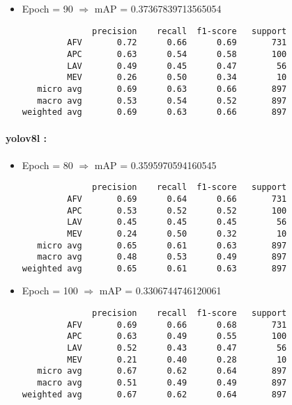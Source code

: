 \begin{itemize}
    \item Epoch = 90 $\Rightarrow$ mAP = 0.37367839713565054
          \begin{verbatim}
              precision    recall  f1-score   support
         AFV       0.72      0.66      0.69       731
         APC       0.63      0.54      0.58       100
         LAV       0.49      0.45      0.47        56
         MEV       0.26      0.50      0.34        10
   micro avg       0.69      0.63      0.66       897
   macro avg       0.53      0.54      0.52       897
weighted avg       0.69      0.63      0.66       897
    \end{verbatim}
\end{itemize}

\paragraph{yolov8l :}
\begin{itemize}
    \item Epoch = 80 $\Rightarrow$ mAP = 0.3595970594160545
          \begin{verbatim}
              precision    recall  f1-score   support
         AFV       0.69      0.64      0.66       731
         APC       0.53      0.52      0.52       100
         LAV       0.45      0.45      0.45        56
         MEV       0.24      0.50      0.32        10
   micro avg       0.65      0.61      0.63       897
   macro avg       0.48      0.53      0.49       897
weighted avg       0.65      0.61      0.63       897
    \end{verbatim}

    \item Epoch = 100 $\Rightarrow$ mAP = 0.3306744746120061
          \begin{verbatim}
              precision    recall  f1-score   support
         AFV       0.69      0.66      0.68       731
         APC       0.63      0.49      0.55       100
         LAV       0.52      0.43      0.47        56
         MEV       0.21      0.40      0.28        10
   micro avg       0.67      0.62      0.64       897
   macro avg       0.51      0.49      0.49       897
weighted avg       0.67      0.62      0.64       897
    \end{verbatim}
\end{itemize}



